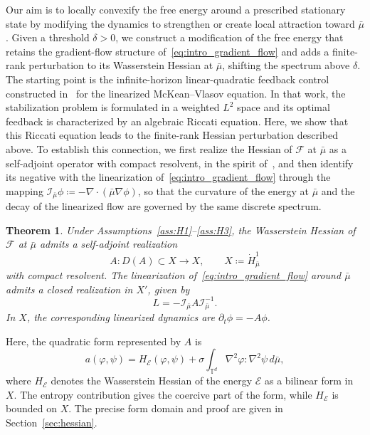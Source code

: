 \documentclass[11pt]{article}
\numberwithin{equation}{section}
\newtheorem{introtheorem}{Theorem}
\theoremstyle{definition}
\newcommand{\T}{\mathbb{T}}
\newcommand{\F}{\mathcal{F}}
\newcommand{\E}{\mathcal{E}}
\newcommand{\potential}[1][\mu]{\dot{H}^1_{#1}}
\newcommand{\rieszmap}[1][\mu]{\mathcal{I}_{#1}}
\begin{document}
Our aim is to locally convexify the free energy around a prescribed stationary state by modifying the dynamics to strengthen or create local attraction toward $\bar\mu$.
Given a threshold $\delta > 0$, we construct a modification of the free energy that retains the gradient-flow structure of~\eqref{eq:intro_gradient_flow} and adds a finite-rank perturbation to its Wasserstein Hessian at $\bar\mu$, shifting the spectrum above $\delta$.
The starting point is the infinite-horizon linear-quadratic feedback control constructed in~\cite{KaliseMoschenPavliotis2025} for the linearized McKean--Vlasov equation.
In that work, the stabilization problem is formulated in a weighted $L^2$ space and its optimal feedback is characterized by an algebraic Riccati equation.
Here, we show that this Riccati equation leads to the finite-rank Hessian perturbation described above.
To establish this connection, we first realize the Hessian of $\F$ at $\bar\mu$ as a self-adjoint operator with compact resolvent, in the spirit of~\cite{denzler2005fast,seis2014long}, and then identify its negative with the linearization of~\eqref{eq:intro_gradient_flow} through the mapping $\rieszmap[\bar\mu] \phi \coloneqq -\nabla \cdot (\bar\mu\nabla\phi)$, so that the curvature of the energy at $\bar\mu$ and the decay of the linearized flow are governed by the same discrete spectrum.

\begin{introtheorem}
    \label{introthm:hessian}
    Under Assumptions~\ref{ass:H1}--\ref{ass:H3}, the Wasserstein Hessian of $\F$ at $\bar\mu$ admits a self-adjoint realization
    \[
    A : D(A) \subset X \to X, \qquad X \coloneqq \potential[\bar\mu]
    \]
    with compact resolvent. 
    The linearization of~\eqref{eq:intro_gradient_flow} around $\bar\mu$ admits a closed realization in $X'$, given by
    \[
    L = -\rieszmap[\bar\mu]A\rieszmap[\bar\mu]^{-1}.
    \]
    In $X$, the corresponding linearized dynamics are $\partial_t\phi = -A\phi$.
\end{introtheorem}

Here, the quadratic form represented by $A$ is
\[
a(\varphi,\psi) = H_\E(\varphi,\psi) + \sigma\int_{\T^d} \nabla^2\varphi:\nabla^2\psi\,d\bar\mu,
\]
where $H_\E$ denotes the Wasserstein Hessian of the energy $\E$ as a bilinear form in $X$.
The entropy contribution gives the coercive part of the form, while $H_\E$ is bounded on $X$.
The precise form domain and proof are given in Section~\ref{sec:hessian}.
\end{document}
